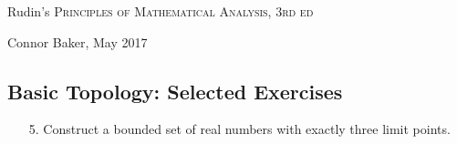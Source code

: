 \documentclass[10pt]{article}
\theoremstyle{definition}
\theoremstyle{plain}
\begin{document}

\begin{center}
  {\Large Rudin's \textsc{Principles of Mathematical Analysis, 3rd ed}}

  {\large Connor Baker, May 2017}

  \subsection*{Basic Topology: Selected Exercises}
\end{center}
\begin{enumerate}
\item[5.] Construct a bounded set of real numbers with exactly three limit points.
\end{enumerate}
\end{document}
